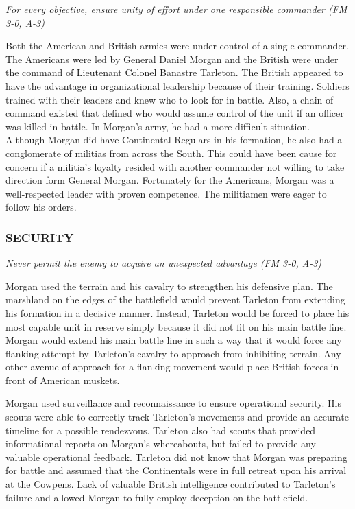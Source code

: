 \textit{For every objective, ensure unity of effort under one responsible
commander (FM 3-0, A-3)}

Both the American and British armies were under control of a single commander.
The Americans were led by General Daniel Morgan and the British were under the
command of Lieutenant Colonel Banastre Tarleton.  The British appeared to have
the advantage in organizational leadership because of their training.  Soldiers
trained with their leaders and knew who to look for in battle. Also, a chain of
command existed that defined who would assume control of the unit if an officer
was killed in battle.  In Morgan’s army, he had a more difficult situation.
Although Morgan did have Continental Regulars in his formation, he also had a
conglomerate of militias from across the South.  This could have been cause for
concern if a militia’s loyalty resided with another commander not willing to
take direction form General Morgan.  Fortunately for the Americans, Morgan was
a well-respected leader with proven competence.  The militiamen were eager to
follow his orders.     

\subsubsection{SECURITY}

\textit{Never permit the enemy to acquire an unexpected advantage (FM 3-0,
A-3)}

Morgan used the terrain and his cavalry to strengthen his defensive plan.  The
marshland on the edges of the battlefield would prevent Tarleton from extending
his formation in a decisive manner.  Instead, Tarleton would be forced to place
his most capable unit in reserve simply because it did not fit on his main
battle line.  Morgan would extend his main battle line in such a way that it
would force any flanking attempt by Tarleton’s cavalry to approach from
inhibiting terrain.  Any other avenue of approach for a flanking movement would
place British forces in front of American muskets.  

Morgan used surveillance and reconnaissance to ensure operational security.
His scouts were able to correctly track Tarleton’s movements and provide an
accurate timeline for a possible rendezvous.  Tarleton also had scouts that
provided informational reports on Morgan’s whereabouts, but failed to provide
any valuable operational feedback.  Tarleton did not know that Morgan was
preparing for battle and assumed that the Continentals were in full retreat
upon his arrival at the Cowpens.  Lack of valuable British intelligence
contributed to Tarleton’s failure and allowed Morgan to fully employ deception
on the battlefield.   

